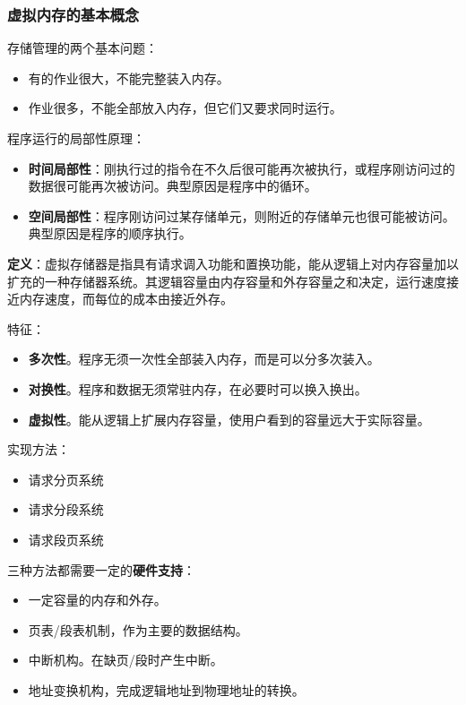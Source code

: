 \documentclass[12pt, a4paper, oneside]{ctexart}
\begin{document}
\subsubsection{虚拟内存的基本概念}

存储管理的两个基本问题：
\begin{itemize}
  \item 有的作业很大，不能完整装入内存。
  \item 作业很多，不能全部放入内存，但它们又要求同时运行。
\end{itemize}

程序运行的局部性原理：
\begin{itemize}
  \item {\bf 时间局部性}：刚执行过的指令在不久后很可能再次被执行，或程序刚访问过的数据很可能再次被访问。典型原因是程序中的循环。
  \item {\bf 空间局部性}：程序刚访问过某存储单元，则附近的存储单元也很可能被访问。典型原因是程序的顺序执行。
\end{itemize}

\textbf{定义}：虚拟存储器是指具有请求调入功能和置换功能，能从逻辑上对内存容量加以扩充的一种存储器系统。其逻辑容量由内存容量和外存容量之和决定，运行速度接近内存速度，而每位的成本由接近外存。

特征：
\begin{itemize}
  \item {\bf 多次性}。程序无须一次性全部装入内存，而是可以分多次装入。
  \item {\bf 对换性}。程序和数据无须常驻内存，在必要时可以换入换出。
  \item {\bf 虚拟性}。能从逻辑上扩展内存容量，使用户看到的容量远大于实际容量。
\end{itemize}

实现方法：
\begin{itemize}
  \item 请求分页系统
  \item 请求分段系统
  \item 请求段页系统
\end{itemize}

三种方法都需要一定的\textbf{硬件支持}：
\begin{itemize}
  \item 一定容量的内存和外存。
  \item 页表/段表机制，作为主要的数据结构。
  \item 中断机构。在缺页/段时产生中断。
  \item 地址变换机构，完成逻辑地址到物理地址的转换。
\end{itemize}
\end{document}

